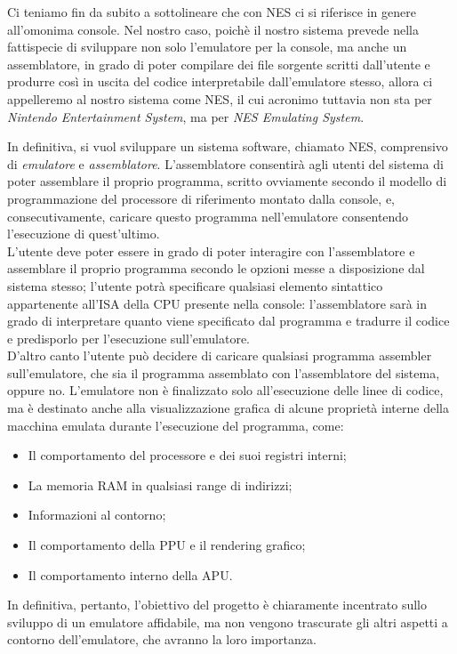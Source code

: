 \documentclass[11pt]{article}
\begin{document}
\clearpage
Ci teniamo fin da subito a sottolineare che con NES ci si riferisce in genere all'omonima console. Nel nostro caso, poichè il nostro sistema prevede nella fattispecie di sviluppare non solo l'emulatore per la console, ma anche un assemblatore, in grado di poter compilare dei file sorgente scritti dall'utente e produrre così in uscita del codice interpretabile dall'emulatore stesso, allora ci appelleremo al nostro sistema come NES, il cui acronimo tuttavia non sta per \emph{Nintendo Entertainment System}, ma per \emph{NES Emulating System}.

In definitiva, si vuol sviluppare un sistema software, chiamato NES, comprensivo di \emph{emulatore} e \emph{assemblatore}. L'assemblatore consentirà agli utenti del sistema di poter assemblare il proprio programma, scritto ovviamente secondo il modello di programmazione del processore di riferimento montato dalla console, e, consecutivamente, caricare questo programma nell'emulatore consentendo l'esecuzione di quest'ultimo.\\
L'utente deve poter essere in grado di poter interagire con l'assemblatore e assemblare il proprio programma secondo le opzioni messe a disposizione dal sistema stesso; l'utente potrà specificare qualsiasi elemento sintattico appartenente all'ISA della CPU presente nella console: l'assemblatore sarà in grado di interpretare quanto viene specificato dal programma e tradurre il codice e predisporlo per l'esecuzione sull'emulatore.\\
D'altro canto l'utente può decidere di caricare qualsiasi programma assembler sull'emulatore, che sia il programma assemblato con l'assemblatore del sistema, oppure no. L'emulatore non è finalizzato solo all'esecuzione delle linee di codice, ma è destinato anche alla visualizzazione grafica di alcune proprietà interne della macchina emulata durante l'esecuzione del programma, come:
\begin{itemize}
	\item{
		Il comportamento del processore e dei suoi registri interni;
	}
	\item{
		La memoria RAM in qualsiasi range di indirizzi;
	}
	\item{
		Informazioni al contorno;
	}
	\item{
		Il comportamento della PPU e il rendering grafico;
	}
	\item{
		Il comportamento interno della APU.
	}
\end{itemize}
In definitiva, pertanto, l'obiettivo del progetto è chiaramente incentrato sullo sviluppo di un emulatore affidabile, ma non vengono trascurate gli altri aspetti a contorno dell'emulatore, che avranno la loro importanza.
\clearpage
\end{document}
